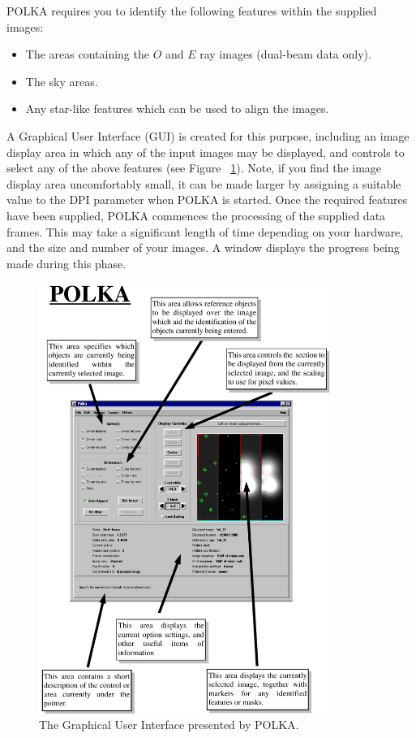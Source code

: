 \documentclass[twoside,11pt]{starlink}
\begin{document}
POLKA requires you to identify the following features within the supplied
images:

\begin{itemize}
\item The areas containing the $O$ and $E$ ray images (dual-beam data only).
\item The sky areas.
\item Any star-like features which can be used to align the images.
\end{itemize}

A Graphical User Interface (GUI) is created for this purpose, including
an image display area in which any of the input images may be displayed,
and controls to select any of the above features (see Figure
~\ref{fig:polka}). Note, if you find the image display area uncomfortably
small, it can be made larger by assigning a suitable value to the DPI
parameter when POLKA is started. Once the required features have been
supplied, POLKA commences the processing of the supplied data frames.
This may take a significant length of time depending on your hardware,
and the size and number of your images. A window displays the progress
being made during this phase.

  \begin{figure}[htpb]
  \begin{center}
  \includegraphics[clip,width=0.85\textwidth]{sun223_figures/polka}
  \vspace{4mm}
  \caption{The Graphical User Interface presented by POLKA.}
  \label{fig:polka}
  \end{center}
  \end{figure}
\end{document}

